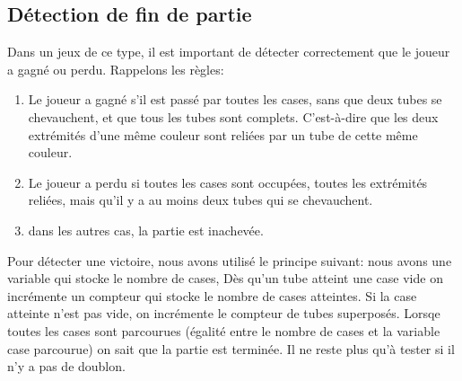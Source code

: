 \documentclass[12pt, a4paper]{article}%
\begin{document}
    \subsection{Détection de fin de partie}
    Dans un jeux de ce type, il est important de détecter correctement que le joueur a gagné ou perdu. Rappelons les règles:
    \begin{enumerate}
        \item Le joueur a gagné s'il est passé par toutes les cases, sans que deux tubes se chevauchent, et que tous les tubes
            sont complets. C'est-à-dire que les deux extrémités d'une même couleur sont reliées par un tube de cette même couleur.
        \item Le joueur a perdu si toutes les cases sont occupées, toutes les extrémités reliées, mais qu'il y a au moins deux
            tubes qui se chevauchent.
        \item dans les autres cas, la partie est inachevée.
    \end{enumerate}
   Pour détecter une victoire, nous avons utilisé le principe suivant: nous avons une variable qui stocke le nombre de cases, Dès
   qu'un tube atteint une case vide on incrémente un compteur qui stocke le nombre de cases atteintes. Si la case atteinte n'est
   pas vide, on incrémente le compteur de tubes superposés. Lorsqe toutes les cases sont parcourues (égalité entre le nombre de
   cases et la variable case parcourue) on sait que la partie est terminée. Il ne reste plus qu'à tester si il n'y a pas de
   doublon.
\end{document}
